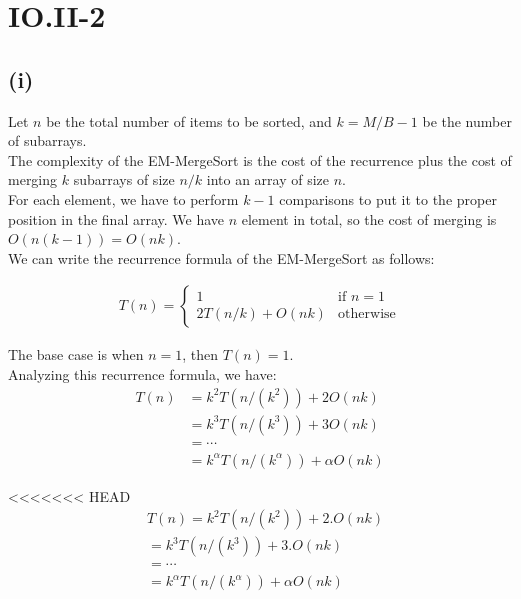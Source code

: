 \section*{IO.II-2}
\subsection*{(i)}
Let $n$ be the total number of items to be sorted, and $k = M/B - 1$ be the number of subarrays.\\

The complexity of the EM-MergeSort is the cost of the recurrence plus the cost of merging $k$ subarrays of size $n/k$ into an array of size $n$. \\ 

For each element, we have to perform $k-1$ comparisons to put it to the proper position in the final array. We have $n$ element in total, so the cost of merging is $O(n(k - 1)) = O(nk)$.\\

We can write the recurrence formula of the EM-MergeSort as follows:

\begin{align*}
	T(n) = \begin{cases}
	    1& \text{if } n = 1\\
        2T(n/k)+O(nk)              & \text{otherwise}
	\end{cases}
\end{align*}

The base case is when $n = 1$, then $T(n) = 1$.\\

Analyzing this recurrence formula, we have:
\begin{align*}
    T(n) &= k^2T(n/(k^2)) + 2O(nk)\\
    &= k^3T(n/(k^3)) + 3O(nk) \\
    &= \cdots \\
    &= k^\alpha T(n/(k^\alpha)) + \alpha O(nk)
\end{align*}

<<<<<<< HEAD
\begin{equation*}
\begin{aligned}
&T(n) = k^2T(n/(k^2)) + 2.O(nk) \\
&= k^3T(n/(k^3)) + 3.O(nk) \\
&= \cdots \\
&= k^\alpha T(n/(k^\alpha)) + \alpha O(nk) \\
\end{aligned}
\end{equation*}



